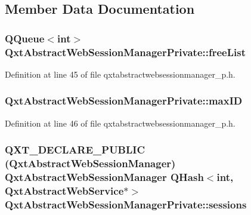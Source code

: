 \subsection{Member Data Documentation}
\hypertarget{class_qxt_abstract_web_session_manager_private_a22467b3e0a9a4ae1aa39e117377eba0c}{
\subsubsection[{free\-List}]{\setlength{\rightskip}{0pt plus 5cm}Q\-Queue$<${\bf int}$>$ Qxt\-Abstract\-Web\-Session\-Manager\-Private\-::free\-List}}\label{class_qxt_abstract_web_session_manager_private_a22467b3e0a9a4ae1aa39e117377eba0c}


Definition at line 45 of file qxtabstractwebsessionmanager\-\_\-p.\-h.

\hypertarget{class_qxt_abstract_web_session_manager_private_af0f1043929773cef74a39c2036404797}{
\subsubsection[{max\-I\-D}]{ Qxt\-Abstract\-Web\-Session\-Manager\-Private\-::max\-I\-D}}\label{class_qxt_abstract_web_session_manager_private_af0f1043929773cef74a39c2036404797}


Definition at line 46 of file qxtabstractwebsessionmanager\-\_\-p.\-h.

\hypertarget{class_qxt_abstract_web_session_manager_private_a5f39e5d4167f6f22a63e4344bcf5ecbf}{
\subsubsection[{sessions}]{\setlength{\rightskip}{0pt plus 5cm}Q\-X\-T\-\_\-\-D\-E\-C\-L\-A\-R\-E\-\_\-\-P\-U\-B\-L\-I\-C ({\bf Qxt\-Abstract\-Web\-Session\-Manager}) {\bf Qxt\-Abstract\-Web\-Session\-Manager} Q\-Hash$<${\bf int}, {\bf Qxt\-Abstract\-Web\-Service}$\ast$$>$ Qxt\-Abstract\-Web\-Session\-Manager\-Private\-::sessions}}\label{class_qxt_abstract_web_session_manager_private_a5f39e5d4167f6f22a63e4344bcf5ecbf}


